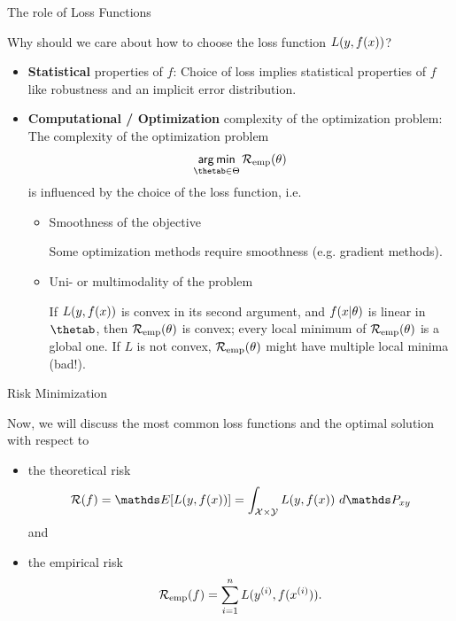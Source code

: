 \begin{vbframe}{The role of Loss Functions}

Why should we care about how to choose the loss function $L(y, f(x))$?

\begin{itemize}
\item \textbf{Statistical} properties of $f$: Choice of loss implies statistical properties of $f$ like robustness and an implicit error distribution.
\item \textbf{Computational / Optimization} complexity of the optimization problem: The complexity of the optimization problem
$$
\argmin_{\thetab \in \Theta} \risket
$$
is influenced by the choice of the loss function, i.e.\

  \begin{itemize}
    \item Smoothness of the objective \\
    \begin{footnotesize} 
    Some optimization methods require smoothness (e.g. gradient methods).
    \end{footnotesize}
    \item Uni- or multimodality of the problem \\
    \begin{footnotesize} 
    If $L(y, f(x))$ is convex in its second argument, and $f(x | \theta)$ is linear in $\thetab$, then $\mathcal{R}_{\text{emp}}(\theta)$ is convex; every local minimum of $\mathcal{R}_{\text{emp}}(\theta)$ is a global one. If $L$ is not convex, $\mathcal{R}_{\text{emp}}(\theta)$ might have multiple local minima (bad!).
    \end{footnotesize}
  \end{itemize}
\end{itemize}


\end{vbframe}



\begin{vbframe}{Risk Minimization}

Now, we will discuss the most common loss functions and the optimal solution with respect to 


\begin{itemize}
  \item the theoretical risk 
  $$
  \riskf =  \E[\Lxy] = \int_{\Xspace \times \Yspace} \Lxy ~ d\Pxy
  $$ 
  and
  \item the empirical risk 
  $$
 \mathcal{R}_{\text{emp}}(f) = \sum_{i=1}^n L(y^{(i)}, f(x^{(i)})). 
  $$
\end{itemize}

\end{vbframe}


